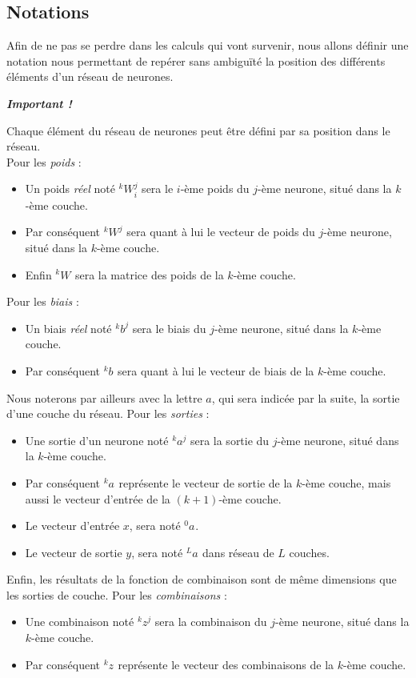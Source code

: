 \documentclass[a4paper, 11pt]{report}
\newcommand{\lexp}[1]{\phantom{}^{#1}}
\newcommand{\elem}[4]{\lexp{#2}#1^{#3}_{#4}}
\begin{document}
\subsection{Notations}
Afin de ne pas se perdre dans les calculs qui vont survenir, nous allons définir une notation nous permettant de repérer sans ambiguïté la position des différents éléments d'un réseau de neurones.
\begin{center}
	\emph{\textbf{Important !}}
\end{center}
Chaque élément du réseau de neurones peut être défini par sa position dans le réseau.\\
Pour les \emph{poids} :
\begin{itemize}
	\item Un poids \emph{réel} noté $\elem{W}{k}{j}{i}$ sera le $i$-ème poids du $j$-ème neurone, situé dans la $k$-ème couche.
	\item Par conséquent $\elem{W}{k}{j}{}$ sera quant à lui le vecteur de poids du $j$-ème neurone, situé dans la $k$-ème couche.
	\item Enfin $\elem{W}{k}{}{}$ sera la matrice des poids de la $k$-ème couche.
	      \end{itemize}
Pour les \emph{biais} :
\begin{itemize}
	\item Un biais \emph{réel} noté $\elem{b}{k}{j}{}$ sera le biais du $j$-ème neurone, situé dans la $k$-ème couche.
	\item Par conséquent $\elem{b}{k}{}{}$ sera quant à lui le vecteur de biais de la $k$-ème couche.
	      \end{itemize}
Nous noterons par ailleurs avec la lettre $a$, qui sera indicée par la suite, la sortie d'une couche du réseau.
Pour les \emph{sorties} :
\begin{itemize}
	\item Une sortie d'un neurone noté $\elem{a}{k}{j}{}$ sera la sortie du $j$-ème neurone, situé dans la $k$-ème couche.
	\item Par conséquent $\elem{a}{k}{}{}$ représente le vecteur de sortie de la $k$-ème couche, mais aussi le vecteur d'entrée de la $(k+1)$-ème couche.
	\item Le vecteur d'entrée $x$, sera noté $\elem{a}{0}{}{}$.
	\item Le vecteur de sortie $y$, sera noté $\elem{a}{L}{}{}$ dans réseau de $L$ couches.
	      \end{itemize}
Enfin, les résultats de la fonction de combinaison sont de même dimensions que les sorties de couche.
Pour les \emph{combinaisons} :
\begin{itemize}
	\item Une combinaison noté $\elem{z}{k}{j}{}$ sera la combinaison du $j$-ème neurone, situé dans la $k$-ème couche.
	\item Par conséquent $\elem{z}{k}{}{}$ représente le vecteur des combinaisons de la $k$-ème couche.
	      \end{itemize}
			
\end{document}
